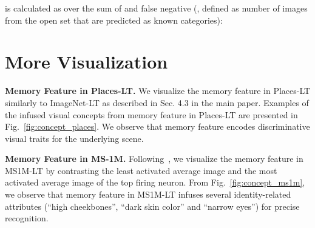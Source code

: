 \documentclass[10pt,twocolumn,letterpaper]{article}
\begin{document}
 is calculated as  over the sum of  and false negative (, defined as number of images from the open set that are predicted as known categories):















\section{More Visualization}
\label{sec:visualization}

\vspace{2pt}
\noindent
\textbf{Memory Feature in Places-LT.}
We visualize the memory feature in Places-LT similarly to ImageNet-LT as described in Sec. 4.3 in the main paper.
Examples of the infused visual concepts from memory feature in Places-LT are presented in Fig.~\ref{fig:concept_places}.
We observe that memory feature encodes discriminative visual traits for the underlying scene.

\vspace{2pt}
\noindent
\textbf{Memory Feature in MS-1M.}
Following~\cite{liu2015deep}, we visualize the memory feature in MS1M-LT by contrasting the least activated average image and the most activated average image of the top firing neuron.
From Fig.~\ref{fig:concept_ms1m}, we observe that memory feature in MS1M-LT infuses several identity-related attributes (\eg ``high cheekbones'', ``dark skin color'' and ``narrow eyes'') for precise recognition.
 
\end{document}
